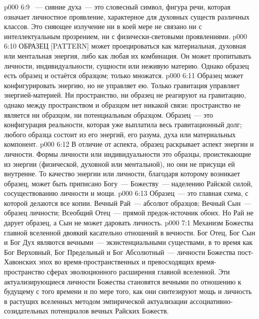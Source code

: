 \vs p000 6:9 \pc {}~--- сияние духа~--- это словесный символ, фигура речи, которая означает личностное проявление, характерное для духовных существ различных классов. Это сияющее излучение ни в коей мере не связано ни с интеллектуальным прозрением, ни с физически\hyp{}световыми проявлениями.
\vs p000 6:10 \pc ОБРАЗЕЦ [PATTERN] может проецироваться как материальная, духовная или ментальная энергия, либо как любая их комбинация. Он может пропитывать личности, индивидуальности, сущности или неживую материю. Однако образец есть образец и остаётся образцом; только  множатся.
\vs p000 6:11 Образец может конфигурировать энергию, но не управляет ею. Только гравитация управляет энергией\hyp{}материей. Ни пространство, ни образец не реагируют на гравитацию, однако между пространством и образцом нет никакой связи: пространство не является ни образцом, ни потенциальным образцом. Образец~--- это конфигурация реальности, которая уже выплатила весь гравитационный долг;  любого образца состоит из его энергий, его разума, духа или материальных компонент.
\vs p000 6:12 В отличие от  аспекта, образец раскрывает  аспект энергии и личности. Формы личности или индивидуальности это образцы, проистекающие из энергии (физической, духовной или ментальной), но они не присущи ей внутренне. То качество энергии или личности, благодаря которому возникает образец, может быть приписано Богу~--- Божеству~--- наделению Райской силой, сосуществованию личности и мощи.
\vs p000 6:13 Образец~--- это главная схема, с которой делаются все копии. Вечный Рай~--- абсолют образцов; Вечный Сын~--- образец личности; Всеобщий Отец~--- прямой предок\hyp{}источник обоих. Но Рай не дарует образец, а Сын не может даровать личность.
\vs p000 7:1 Механизм Божества главной вселенной двоякий касательно отношений в вечности. Бог Отец, Бог Сын и Бог Дух являются вечными~--- экзистенциальными существами, в то время как Бог Верховный, Бог Предельный и Бог Абсолютный~---  личности Божества пост\hyp{}Хавонских эпох во время\hyp{}пространственных и превосходящих время\hyp{}пространство сферах эволюционного расширения главной вселенной. Эти актуализирующиеся личности Божества становятся вечными по отношению к будущему с того времени и по мере того, как они синтезируют мощь и личность в растущих вселенных методом эмпирической актуализации ассоциативно\hyp{}созидательных потенциалов вечных Райских Божеств.
